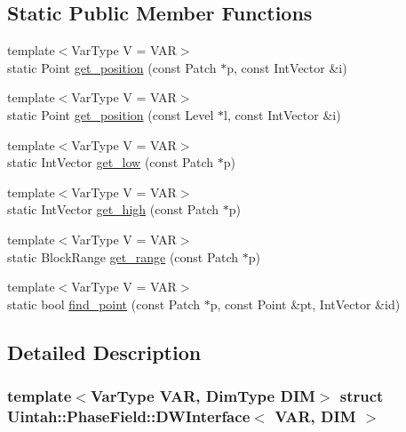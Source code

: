 \subsection*{Static Public Member Functions}
\begin{DoxyCompactItemize}
\item 
{\footnotesize template$<$Var\+Type V = V\+AR$>$ }\\static Point \hyperlink{structUintah_1_1PhaseField_1_1DWInterface_aa1c394ba8e632d416d9a3da757055408}{get\+\_\+position} (const Patch $\ast$p, const Int\+Vector \&i)
\item 
{\footnotesize template$<$Var\+Type V = V\+AR$>$ }\\static Point \hyperlink{structUintah_1_1PhaseField_1_1DWInterface_a0e58176333dc74f9a936248a7a7194a2}{get\+\_\+position} (const Level $\ast$l, const Int\+Vector \&i)
\item 
{\footnotesize template$<$Var\+Type V = V\+AR$>$ }\\static Int\+Vector \hyperlink{structUintah_1_1PhaseField_1_1DWInterface_aa7342c67207852dee747a79aaef18d0e}{get\+\_\+low} (const Patch $\ast$p)
\item 
{\footnotesize template$<$Var\+Type V = V\+AR$>$ }\\static Int\+Vector \hyperlink{structUintah_1_1PhaseField_1_1DWInterface_a963134e752d1511f7600c4cfb00350a6}{get\+\_\+high} (const Patch $\ast$p)
\item 
{\footnotesize template$<$Var\+Type V = V\+AR$>$ }\\static Block\+Range \hyperlink{structUintah_1_1PhaseField_1_1DWInterface_aaf163a6173f0ed2d092bb7d2d6b18a21}{get\+\_\+range} (const Patch $\ast$p)
\item 
{\footnotesize template$<$Var\+Type V = V\+AR$>$ }\\static bool \hyperlink{structUintah_1_1PhaseField_1_1DWInterface_a0914b9ebb7d4aba921e212d5a47f55c9}{find\+\_\+point} (const Patch $\ast$p, const Point \&pt, Int\+Vector \&id)
\end{DoxyCompactItemize}


\subsection{Detailed Description}
\subsubsection*{template$<$Var\+Type V\+AR, Dim\+Type D\+IM$>$\newline
struct Uintah\+::\+Phase\+Field\+::\+D\+W\+Interface$<$ V\+A\+R, D\+I\+M $>$}

